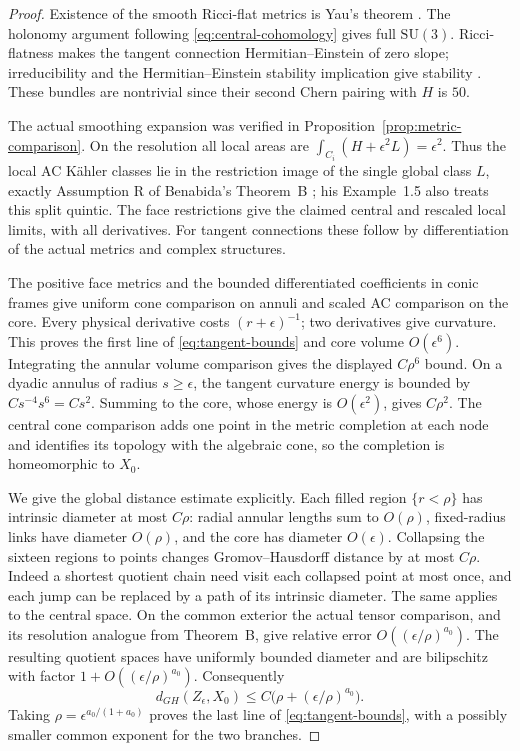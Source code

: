 \begin{proof}
Existence of the smooth Ricci-flat metrics is Yau's theorem \cite{yau}.
The holonomy argument following \eqref{eq:central-cohomology} gives
full $\mathrm{SU}(3)$. Ricci-flatness makes the tangent connection
Hermitian--Einstein of zero slope; irreducibility and the
Hermitian--Einstein stability implication give stability
\cite[Theorem~5.8.3]{kobayashi}. These bundles are nontrivial since their
second Chern pairing with $H$ is $50$.

The actual smoothing expansion was verified in
Proposition~\ref{prop:metric-comparison}. On the resolution all local
areas are $\int_{C_i}(H+\epsilon^2L)=\epsilon^2$. Thus the local AC
K\"ahler classes lie in the restriction image of the single global
class $L$, exactly Assumption R of Benabida's Theorem~B
\cite{benabida}; his Example~1.5 also treats this split quintic.
The face restrictions give the claimed central and rescaled local
limits, with all derivatives. For tangent connections these follow
by differentiation of the actual metrics and complex structures.

The positive face metrics and the bounded differentiated coefficients
in conic frames give uniform cone comparison on annuli and scaled
AC comparison on the core. Every physical derivative costs
$(r+\epsilon)^{-1}$; two derivatives give curvature. This proves the
first line of \eqref{eq:tangent-bounds} and core volume $O(\epsilon^6)$.
Integrating the annular volume comparison gives the displayed
$C\rho^6$ bound. On a dyadic annulus of radius $s\ge\epsilon$,
the tangent curvature energy is bounded by $Cs^{-4}s^6=Cs^2$.
Summing to the core, whose energy is $O(\epsilon^2)$, gives $C\rho^2$.
The central cone comparison adds one point in the metric completion
at each node and identifies its topology with the algebraic cone,
so the completion is homeomorphic to $X_0$.

We give the global distance estimate explicitly. Each filled region
$\{r<\rho\}$ has intrinsic diameter at most $C\rho$: radial annular
lengths sum to $O(\rho)$, fixed-radius links have diameter $O(\rho)$,
and the core has diameter $O(\epsilon)$. Collapsing the sixteen
regions to points changes Gromov--Hausdorff distance by at most
$C\rho$. Indeed a shortest quotient chain need visit each collapsed
point at most once, and each jump can be replaced by a path of its
intrinsic diameter. The same applies to the central space. On the
common exterior the actual tensor comparison, and its resolution
analogue from Theorem~B, give relative error $O((\epsilon/\rho)^{a_0})$.
The resulting quotient spaces have uniformly bounded diameter and
are bilipschitz with factor $1+O((\epsilon/\rho)^{a_0})$.
Consequently
\[
 d_{GH}(Z_\epsilon,X_0)\le C\bigl(\rho+(\epsilon/\rho)^{a_0}\bigr).
\]
Taking $\rho=\epsilon^{a_0/(1+a_0)}$ proves the last line of
\eqref{eq:tangent-bounds}, with a possibly smaller common exponent
for the two branches.
\end{proof}

